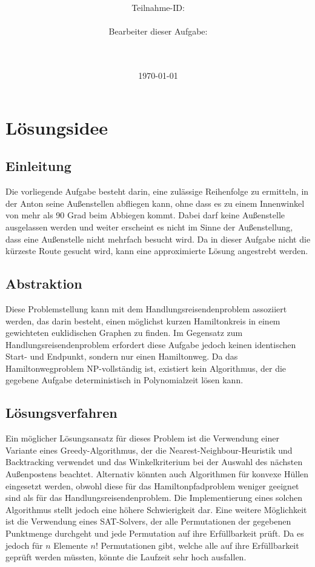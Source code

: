 \documentclass[a4paper,10pt,ngerman]{scrartcl}
\title{\textbf{\Huge\Aufgabe}}
\author{\LARGE Teilnahme-ID: \LARGE \TeilnahmeId \\\\
\LARGE Bearbeiter dieser Aufgabe: \\
\LARGE \Name\\\\}
\date{\LARGE\today}
\begin{document}
    \maketitle
    \tableofcontents
    \vspace{0.5cm}
    \newpage

    \section{Lösungsidee}\label{sec:losungsidee}
    \subsection{Einleitung}\label{subsec:einleitung}

    Die vorliegende Aufgabe besteht darin, eine zulässige Reihenfolge zu ermitteln,
    in der Anton seine Außenstellen abfliegen kann,
    ohne dass es zu einem Innenwinkel von mehr als 90 Grad beim Abbiegen kommt.
    Dabei darf keine Außenstelle ausgelassen werden und weiter erscheint es nicht im Sinne der Außenstellung,
    dass eine Außenstelle nicht mehrfach besucht wird.
    Da in dieser Aufgabe nicht die kürzeste Route gesucht wird, kann eine approximierte Lösung angestrebt werden.

    \subsection{Abstraktion}\label{subsec:abstraktion}

    Diese Problemstellung kann mit dem Handlungsreisendenproblem assoziiert werden,
    das darin besteht, einen möglichst kurzen Hamiltonkreis in einem gewichteten euklidischen Graphen zu finden.
    Im Gegensatz zum Handlungsreisendenproblem erfordert diese Aufgabe jedoch keinen identischen Start- und Endpunkt,
    sondern nur einen Hamiltonweg.
    Da das Hamiltonwegproblem NP-vollständig ist,
    existiert kein Algorithmus, der die gegebene Aufgabe deterministisch in Polynomialzeit lösen kann.
    \subsection{Lösungsverfahren}\label{subsec:losungsverfahren}
    Ein möglicher Lösungsansatz für dieses Problem ist die Verwendung einer Variante eines Greedy-Algorithmus,
    der die Nearest-Neighbour-Heuristik und Backtracking verwendet
    und das Winkelkriterium bei der Auswahl des nächsten Außenpostens beachtet.
    Alternativ könnten auch Algorithmen für konvexe Hüllen eingesetzt werden,
    obwohl diese für das Hamiltonpfadproblem weniger geeignet sind als für das Handlungsreisendenproblem.
    Die Implementierung eines solchen Algorithmus stellt jedoch eine höhere Schwierigkeit dar.
    Eine weitere Möglichkeit ist die Verwendung eines SAT-Solvers, der alle Permutationen der gegebenen Punktmenge durchgeht und
    jede Permutation auf ihre Erfüllbarkeit prüft.
    Da es jedoch für $n$ Elemente $n!$ Permutationen gibt, welche alle auf ihre Erfüllbarkeit geprüft werden müssten,
    könnte die Laufzeit sehr hoch ausfallen.
\end{document}
